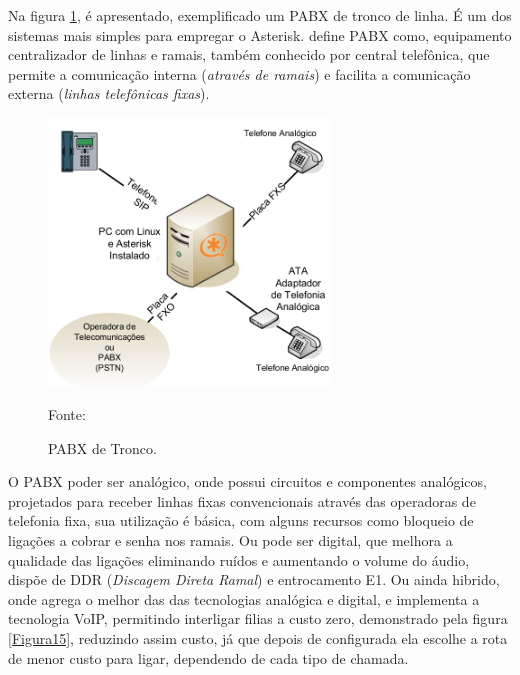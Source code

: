Na figura \ref{Figura14}, é apresentado, exemplificado um PABX de tronco de linha. É um dos sistemas mais simples para empregar o Asterisk.  define PABX como, equipamento centralizador de linhas e ramais, também conhecido por central telefônica, que permite a comunicação interna (\textit{através de ramais}) e facilita  a comunicação externa (\textit{linhas telefônicas fixas}). 

\begin{figure}[h]
	\centering
	\includegraphics[width=7.5cm]{imagens/PABXAsterisk.jpg}
	\caption{PABX de Tronco.}
    \label{Figura14}
    Fonte: \cite{flavioeduardoandredade2005}
\end{figure}

O PABX poder ser analógico, onde possui circuitos e componentes analógicos, projetados para receber linhas fixas convencionais através das operadoras de telefonia fixa, sua utilização é básica, com alguns recursos como bloqueio de ligações a cobrar e senha nos ramais. Ou pode ser digital, que melhora a qualidade das ligações eliminando ruídos e aumentando o volume do áudio, dispõe de DDR (\textit{Discagem Direta Ramal}) e entrocamento E1. Ou ainda hibrido, onde agrega o melhor das das tecnologias analógica e digital, e implementa a tecnologia VoIP, permitindo interligar filias a custo zero, demonstrado pela figura \ref{Figura15}, reduzindo assim custo, já que depois de configurada ela escolhe a rota de menor custo para ligar, dependendo de cada tipo de chamada. \cite{djaneelmajoanine2007}


